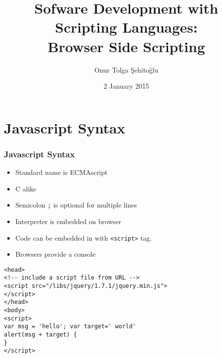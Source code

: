 \documentclass[trans,compress,xcolor=table]{beamer}
\title{Sofware Development with Scripting Languages:\\Browser Side Scripting}
\author{Onur Tolga Şehitoğlu}
\institute{Computer Engineering,METU}
\date{2 January 2015}
\begin{document}

%


 \frame{\maketitle}
\begin{frame}
\begin{multicols}{2}
\tableofcontents
\end{multicols}
\end{frame}

\section{Javascript Syntax}
\begin{frame}
\frametitle{Javascript Syntax}
\begin{itemize}
\item Standard name is ECMAscript
\item C alike
\item Semicolon \lstinline!;! is optional for multiple lines
\item Interpreter is embedded on browser
\item Code can be embedded in  with \lstinline!<script>!
	tag.
\item Browsers provide a  console
\end{itemize}
\end{frame}


\begin{frame}[fragile]
\begin{lstlisting}
<head>
<!-- include a script file from URL -->
<script src="/libs/jquery/1.7.1/jquery.min.js">
</script>
</head>
<body>
<script>
var msg = 'hello'; var target=' world'
alert(msg + target) {
}
</script>
\end{lstlisting}
\end{frame}
\end{document}
